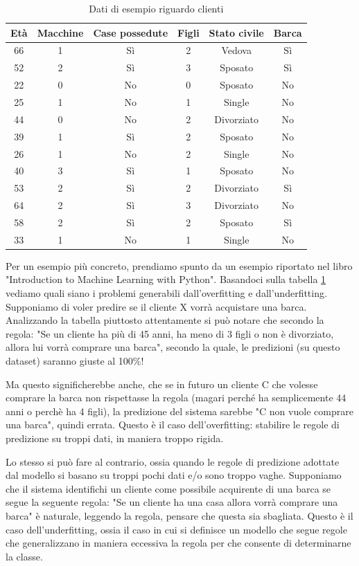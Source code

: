 \documentclass[12pt,italian]{report}
\begin{document}
\begin{table}[h!]
	\center
	\caption{Dati di esempio riguardo clienti}
	\label{table_customers}
	\vspace{3 mm}
	\begin{tabular}{|c|c|c|c|c|c|}
		\hline
		Età & Macchine &  Case possedute & Figli & Stato civile & Barca    \\
		\hline
		66 & 1 & Sì & 2 & Vedova & Sì \\
		52 & 2 & Sì & 3 & Sposato & Sì \\
		22 & 0 & No & 0 & Sposato & No \\
		25 & 1 & No & 1 & Single & No \\
		44 & 0 & No & 2 & Divorziato & No \\
		39 & 1 & Sì & 2 & Sposato & No \\
		26 & 1 & No & 2 & Single & No \\
		40 & 3 & Sì & 1 & Sposato & No \\
		53 & 2 & Sì & 2 & Divorziato & Sì \\
		64 & 2 & Sì & 3 & Divorziato & No \\
		58 & 2 & Sì & 2 & Sposato & Sì \\
		33 & 1 & No & 1 & Single & No \\
		\hline
	\end{tabular}
\end{table}

Per un esempio più concreto, prendiamo spunto da un esempio riportato nel libro "Introduction to Machine Learning with Python". Basandoci sulla tabella \ref{table_customers} vediamo quali siano i problemi generabili dall'overfitting e dall'underfitting. Supponiamo di voler predire se il cliente X vorrà acquistare una barca. Analizzando la tabella piuttosto attentamente si può notare che secondo la regola: "Se un cliente ha più di 45 anni, ha meno di 3 figli o non è divorziato, allora lui vorrà comprare una barca", secondo la quale, le predizioni (su questo dataset) saranno giuste al 100\%! 

Ma questo significherebbe anche, che se in futuro un cliente C che volesse comprare la barca non rispettasse la regola (magari perché ha semplicemente 44 anni o perchè ha 4 figli), la predizione del sistema sarebbe "C non vuole comprare una barca", quindi errata. Questo è il caso dell'overfitting: stabilire le regole di predizione su troppi dati, in maniera troppo rigida.

Lo stesso si può fare al contrario, ossia quando le regole di predizione adottate dal modello si basano su troppi pochi dati e/o sono troppo vaghe. Supponiamo che il sistema identifichi un cliente come possibile acquirente di una barca se segue la seguente regola: "Se un cliente ha una casa allora vorrà comprare una barca" è naturale, leggendo la regola, pensare che questa sia sbagliata. Questo è il caso dell'underfitting, ossia il caso in cui si definisce un modello che segue regole che generalizzano in maniera eccessiva la regola per che consente di determinarne la classe.
\end{document}
